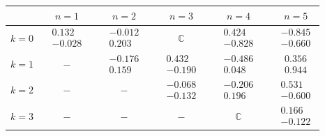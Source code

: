 \begin{table}[tbp]
\centering
\begin{tabular}{cccccc}
\hline
	& \, $n = 1$ \, & \, $n = 2$ \, & \, $n = 3$ \, & \, $n = 4$ \, & \, $n = 5$ \\ \hline
	$k = 0$ & \, $\begin{array}{c} 0.132 \\ -0.028 \end{array}$ \, & \, $\begin{array}{c} -0.012 \\ 0.203 \end{array}$ \, & \, $\mathbb{C}$ \, & \, $\begin{array}{c} 0.424 \\ -0.828 \end{array}$ \, & \, $\begin{array}{c} -0.845 \\ -0.660 \end{array}$ \\ \hline
	$k = 1$ & \, $-$ \, & \, $\begin{array}{c} -0.176 \\ 0.159 \end{array}$ \, & \, $\begin{array}{c} 0.432 \\ -0.190 \end{array}$ \, & \, $\begin{array}{c} -0.486 \\ 0.048 \end{array}$ \, & \, $\begin{array}{c} 0.356 \\ 0.944 \end{array}$ \\ \hline
	$k = 2$ & \, $-$ \, & \, $-$ \, & \, $\begin{array}{c} -0.068 \\ -0.132 \end{array}$ \, & \, $\begin{array}{c} -0.206 \\ 0.196 \end{array}$ \, & \, $\begin{array}{c} 0.531 \\ -0.600 \end{array}$ \\ \hline
	$k = 3$ & \, $-$ \, & \, $-$ \, & \, $-$ \, & \, $\mathbb{C}$ \, & \, $\begin{array}{c} 0.166 \\ -0.122 \end{array}$ \\ \hline

\end{tabular}
\end{table}

